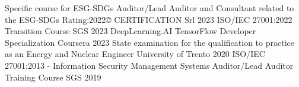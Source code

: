 
\begin{cvhonors}

\cvhonor
{Specific course for ESG-SDGs Auditor/Lead Auditor and Consultant related to the ESG-SDGs Rating:2022©}
{}
{CERTIFICATION Srl}
{2023}
\cvhonor
{ISO/IEC 27001:2022 Transition Course}
{}
{SGS}
{2023}
\cvhonor
{DeepLearning.AI TensorFlow Developer Specialization}
{}
{Coursera}
{2023}
\cvhonor
{State examination for the qualification to practice as an Energy and Nuclear Engineer}
{}
{University of Trento}
{2020}
\cvhonor
{ISO/IEC 27001:2013 - Information Security Management Systems Auditor/Lead Auditor Training Course}
{}
{SGS}
{2019}
\end{cvhonors}